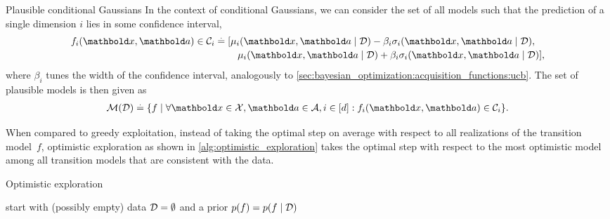 \begin{ex}{Plausible conditional Gaussians}{}
  In the context of conditional Gaussians, we can consider the set of all models such that the prediction of a single dimension $i$ lies in some confidence interval, \begin{align}
    f_i(\vx, \va) \in \spC_{i} \defeq \begin{multlined}[t]
      [\mu_i(\vx,\va\mid\spD)-\beta_i\sigma_i(\vx,\va\mid\spD), \\ \mu_i(\vx,\va\mid\spD)+\beta_i\sigma_i(\vx,\va\mid\spD)],
    \end{multlined} \label{eq:plausible_gaussian_confidence_intervals}
  \end{align} where $\beta_i$ tunes the width of the confidence interval, analogously to \cref{sec:bayesian_optimization:acquisition_functions:ucb}.
  The set of plausible models is then given as \begin{align}
    \spM(\spD) \defeq \{f \mid \forall \vx \in \spX, \va \in \spA, i \in [d] : f_i(\vx, \va) \in \spC_{i}\}.
  \end{align}
\end{ex}

When compared to greedy exploitation, instead of taking the optimal step on average with respect to all realizations of the transition model~$f$, optimistic exploration as shown in \cref{alg:optimistic_exploration} takes the optimal step with respect to the most optimistic model among all transition models that are consistent with the data.

\begin{algorithm}
  \caption{Optimistic exploration}\label{alg:optimistic_exploration}
  start with (possibly empty) data $\mathcal{D} = \emptyset$ and a prior $p(f) = p(f \mid \mathcal{D})$\;
\end{algorithm}

